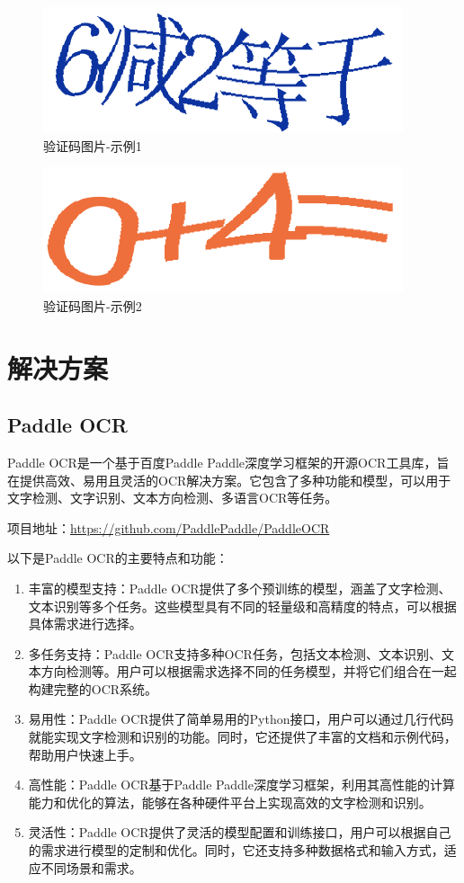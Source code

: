 \begin{figure}
	\centering
	\includegraphics[width=0.7\linewidth]{Resources/Picture/Test/test1_20240102160004_server}
	\caption{验证码图片-示例1}
	\label{fig:test120240102160004server}
\end{figure}

\begin{figure}
	\centering
	\includegraphics[width=0.7\linewidth]{Resources/Picture/Test/test2_20240102160811_server}
	\caption{验证码图片-示例2}
	\label{fig:test220240102160811server}
\end{figure}

\section{解决方案}

\subsection{Paddle OCR}

Paddle OCR是一个基于百度Paddle Paddle深度学习框架的开源OCR工具库，旨在提供高效、易用且灵活的OCR解决方案。它包含了多种功能和模型，可以用于文字检测、文字识别、文本方向检测、多语言OCR等任务。

项目地址：\url{https://github.com/PaddlePaddle/PaddleOCR}

以下是Paddle OCR的主要特点和功能：

\begin{enumerate}
	\item 丰富的模型支持：Paddle OCR提供了多个预训练的模型，涵盖了文字检测、文本识别等多个任务。这些模型具有不同的轻量级和高精度的特点，可以根据具体需求进行选择。
	\item 多任务支持：Paddle OCR支持多种OCR任务，包括文本检测、文本识别、文本方向检测等。用户可以根据需求选择不同的任务模型，并将它们组合在一起构建完整的OCR系统。
	\item 易用性：Paddle OCR提供了简单易用的Python接口，用户可以通过几行代码就能实现文字检测和识别的功能。同时，它还提供了丰富的文档和示例代码，帮助用户快速上手。
	\item 高性能：Paddle OCR基于Paddle Paddle深度学习框架，利用其高性能的计算能力和优化的算法，能够在各种硬件平台上实现高效的文字检测和识别。
	\item 灵活性：Paddle OCR提供了灵活的模型配置和训练接口，用户可以根据自己的需求进行模型的定制和优化。同时，它还支持多种数据格式和输入方式，适应不同场景和需求。
\end{enumerate}

